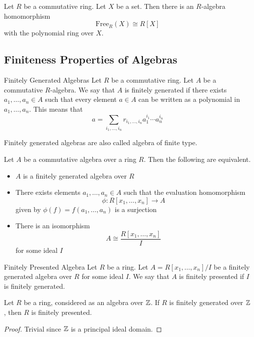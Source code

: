 \documentclass[a4paper]{article}
\begin{document}
\begin{prp}{}{} Let $R$ be a commutative ring. Let $X$ be a set. Then there is an $R$-algebra homomorphism $$\text{Free}_R(X)\cong R[X]$$ with the polynomial ring over $X$. 
\end{prp}

\subsection{Finiteness Properties of Algebras}
\begin{defn}{Finitely Generated Algebras}{} Let $R$ be a commutative ring. Let $A$ be a commutative $R$-algebra. We say that $A$ is finitely generated if there exists $a_1,\dots,a_n\in A$ such that every element $a\in A$ can be written as a polynomial in $a_1,\dots,a_n$. This means that $$a=\sum_{i_1,\dots,i_n}r_{i_1,\dots,i_n}a_1^{i_1}\cdots a_n^{i_n}$$
\end{defn}

Finitely generated algebras are also called algebra of finite type. 

\begin{thm}{}{} Let $A$ be a commutative algebra over a ring $R$. Then the following are equivalent. 
\begin{itemize}
\item $A$ is a finitely generated algebra over $R$
\item There exists elements $a_1,\dots,a_n\in A$ such that the evaluation homomorphism $$\phi:R[x_1,\dots,x_n]\to A$$ given by $\phi(f)=f(a_1,\dots,a_n)$ is a surjection
\item There is an isomorphism $$A\cong\frac{R[x_1,\dots,x_n]}{I}$$ for some ideal $I$
\end{itemize}
\end{thm}

\begin{defn}{Finitely Presented Algebra}{} Let $R$ be a ring. Let $A=R[x_1,\dots,x_n]/I$ be a finitely generated algebra over $R$ for some ideal $I$. We say that $A$ is finitely presented if $I$ is finitely generated. 
\end{defn}

\begin{lmm}{}{} Let $R$ be a ring, considered as an algebra over $\mathbb{Z}$. If $R$ is finitely generated over $\mathbb{Z}$, then $R$ is finitely presented. \tcbline
\begin{proof}
Trivial since $\mathbb{Z}$ is a principal ideal domain. 
\end{proof}
\end{lmm}
\end{document}
